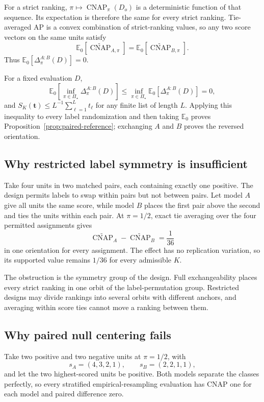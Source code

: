 \documentclass[11pt]{article}
\newcommand{\CNAP}{\operatorname{CNAP}}
\newcommand{\PSet}{\Pi_\star}
\newcommand{\E}{\mathbb{E}}
\newcommand{\CNAPta}{\widetilde{\CNAP}}
\theoremstyle{remark}
\begin{document}
For a strict ranking, $\pi\mapsto\CNAP_\pi(D_o)$ is a deterministic function of that sequence. Its expectation is therefore the same for every strict ranking. Tie-averaged AP is a convex combination of strict-ranking values, so any two score vectors on the same units satisfy
\[
\E_0[\CNAPta_{A,\pi}]
=
\E_0[\CNAPta_{B,\pi}].
\]
Thus $\E_0[\Delta^{A:B}_\pi(D)]=0$.

For a fixed evaluation $D$,
\[
\E_0\!\left[
\inf_{\pi\in\PSet}\Delta^{A:B}_\pi(D)
\right]
\leq
\inf_{\pi\in\PSet}\E_0[\Delta^{A:B}_\pi(D)]
=0,
\]
and $S_K(\mathbf t)\leq L^{-1}\sum_{\ell=1}^Lt_\ell$ for any finite list of length $L$. Applying this inequality to every label randomization and then taking $\E_0$ proves Proposition~\ref{prop:paired-reference}; exchanging $A$ and $B$ proves the reversed orientation.

\subsection{Why restricted label symmetry is insufficient}

Take four units in two matched pairs, each containing exactly one positive. The design permits labels to swap within pairs but not between pairs. Let model $A$ give all units the same score, while model $B$ places the first pair above the second and ties the units within each pair. At $\pi=1/2$, exact tie averaging over the four permitted assignments gives
\[
\CNAPta_A-\CNAPta_B
=
\frac1{36}
\]
in one orientation for every assignment. The effect has no replication
variation, so its supported value remains $1/36$ for every admissible $K$.

The obstruction is the symmetry group of the design. Full exchangeability places every strict ranking in one orbit of the label-permutation group. Restricted designs may divide rankings into several orbits with different anchors, and averaging within score ties cannot move a ranking between them.

\subsection{Why paired null centering fails}

Take two positive and two negative units at $\pi=1/2$, with
\[
s_A=(4,3,2,1),
\qquad
s_B=(2,2,1,1),
\]
and let the two highest-scored units be positive. Both models separate the classes perfectly, so every stratified empirical-resampling evaluation has CNAP one for each model and paired difference zero.
\end{document}
